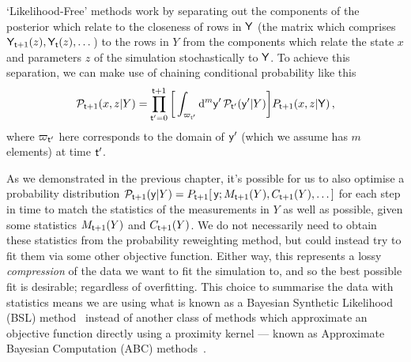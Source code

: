 `Likelihood-Free' methods work by separating out the components of the posterior which relate to the closeness of rows in ${\sf Y}$ (the matrix which comprises ${\sf Y}_{{\sf t}+1}(z), {\sf Y}_{{\sf t}}(z), \dots$) to the rows in $Y$ from the components which relate the state $x$ and parameters $z$ of the simulation stochastically to ${\sf Y}$. To achieve this separation, we can make use of chaining conditional probability like this
\begin{align}
{\cal P}_{{\sf t}+1}(x,z\vert Y)=\prod_{{\sf t}'=0}^{{\sf t}+1} \bigg[ \int_{\varpi_{{\sf t}'}} {\rm d}^m{\sf y}' \, {\cal P}_{{\sf t}'}({\sf y}'\vert Y) \bigg] P_{{\sf t}+1}(x,z \vert {\sf Y}) \label{eq:likelihood-free-posterior} \,,
\end{align}
where $\varpi_{{\sf t}'}$ here corresponds to the domain of ${\sf y}'$ (which we assume has $m$ elements) at time ${\sf t}'$.

As we demonstrated in the previous chapter, it's possible for us to also optimise a probability distribution ${\cal P}_{{\sf t}+1}({\sf y}\vert Y) = P_{{\sf t}+1}[\,{\sf y};M_{{\sf t}+1}(Y),C_{{\sf t}+1}(Y), \dots ]$ for each step in time to match the statistics of the measurements in $Y$ as well as possible, given some statistics $M_{{\sf t}+1}(Y)$ and $C_{{\sf t}+1}(Y)$. We do not necessarily need to obtain these statistics from the probability reweighting method, but could instead try to fit them via some other objective function. Either way, this represents a lossy \emph{compression} of the data we want to fit the simulation to, and so the best possible fit is desirable; regardless of overfitting. This choice to summarise the data with statistics means we are using what is known as a Bayesian Synthetic Likelihood (BSL) method~\cite{price2018bayesian,wood2010statistical} instead of another class of methods which approximate an objective function directly using a proximity kernel --- known as Approximate Bayesian Computation (ABC) methods~\cite{sisson2018handbook}.

